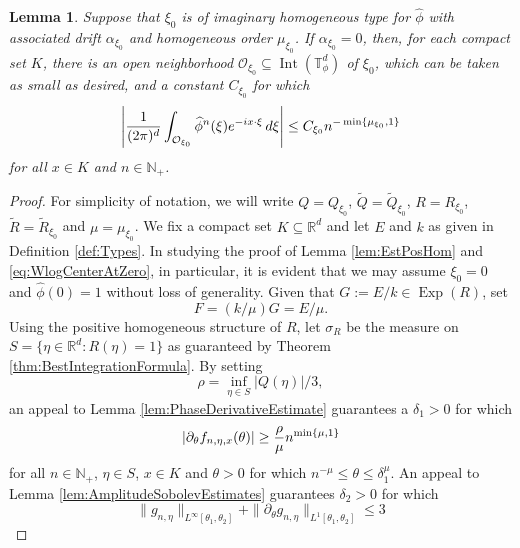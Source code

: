 \documentclass[11pt]{article}
\newtheorem{lemma}[theorem]{Lemma}
\theoremstyle{remark}
\newcommand\Exp{\operatorname{Exp}}
\newcommand\Interior{\operatorname{Int}}
\newcommand{\p}{\partial}
\newcommand{\f}[2]{\frac{#1}{#2}}
\begin{document}
\begin{lemma}\label{lem:EstImagHom}
Suppose that $\xi_0$ is of imaginary homogeneous type for $\widehat{\phi}$ with associated drift $\alpha_{\xi_0}$ and homogeneous order $\mu_{\xi_0}$. If $\alpha_{\xi_0}=0$, then, for each compact set $K$, there is an open neighborhood $\mathcal{O}_{\xi_0}\subseteq\Interior(\mathbb{T}_\phi^d)$ of $\xi_0$, which can be taken as small as desired, and a constant $C_{\xi_0}$ for which
\begin{equation*}
    \abs{\f{1}{(2\pi)^d}\int_{\mathcal{O}_{\xi_0}}\widehat{\phi}^n(\xi)e^{-ix\cdot\xi}\,d\xi}\leq C_{\xi_0}n^{-\min\{\mu_{\xi_0},1\}}
\end{equation*}
for all $x\in K$ and $n\in\mathbb{N}_+$.
\end{lemma}
\begin{proof}
For simplicity of notation, we will write $Q=Q_{\xi_0}$, $\widetilde{Q}=\widetilde{Q}_{\xi_0}$, $R=R_{\xi_0}$, $\widetilde{R}=\widetilde{R}_{\xi_0}$ and $\mu=\mu_{\xi_0}$. We fix a compact set $K\subseteq\mathbb{R}^d$ and let $E$ and $k$ as given in Definition \ref{def:Types}. In studying the proof of Lemma \ref{lem:EstPosHom} and \eqref{eq:WlogCenterAtZero}, in particular, it is evident that we may assume $\xi_0=0$ and $\widehat{\phi}(0)=1$ without loss of generality. Given that $G:=E/k\in\Exp(R)$, set
\begin{equation*}
    F=(k/\mu)G=E/\mu.
\end{equation*} Using the positive homogeneous structure of $R$, let $\sigma_R$ be the measure on $S=\{\eta\in \mathbb{R}^d:R(\eta)=1\}$ as guaranteed by Theorem \ref{thm:BestIntegrationFormula}. By setting
\begin{equation*}
    \rho=\inf_{\eta\in S}|Q(\eta)|/3,
\end{equation*}
an appeal to Lemma \ref{lem:PhaseDerivativeEstimate} guarantees a $\delta_1>0$ for which 
\begin{equation}\label{eq:EstImagHom1}
    \abs{\partial_{\theta}f_{n,\eta,x}(\theta)}\geq \frac{\rho}{\mu}n^{\min\{\mu,1\}}
\end{equation} for all $n\in\mathbb{N}_+$, $\eta\in S$, $x\in K$ and $\theta>0$ for which $n^{-\mu}\leq \theta\leq \delta_1^\mu$. An appeal to Lemma \ref{lem:AmplitudeSobolevEstimates} guarantees $\delta_2>0$ for which
\begin{equation}\label{eq:EstImagHom2}
    \|g_{n,\eta}\|_{L^\infty[\theta_1,\theta_2]}
    +
    \|\p_\theta g_{n,\eta} \|_{ L^1[\theta_1,\theta_2]}
    \leq 3
\end{equation}

\end{proof}
\end{document}
